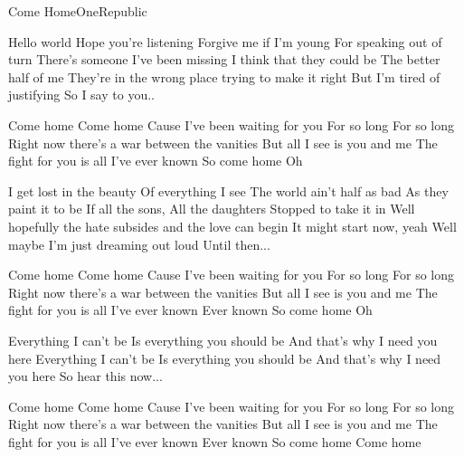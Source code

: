 \documentclass[a4paper,11pt,french]{article}
\begin{document}
\begin{Song}{Come Home}{OneRepublic}
\begin{multicols}{2}

\begin{Verse}
Hello world
Hope you're listening
Forgive me if I’m young
For speaking out of turn
There’s someone I’ve been missing
I think that they could be
The better half of me
They’re in the wrong place trying to make it right
But I’m tired of justifying
So I say to you..
\end{Verse}
\espaceInterStrophe

\begin{Chorus}
Come home
Come home
Cause I’ve been waiting for you
For so long
For so long
Right now there's a war between the vanities
But all I see is you and me
The fight for you is all I’ve ever known
So come home
Oh
\end{Chorus}
\espaceInterStrophe

\begin{Verse}
I get lost in the beauty
Of everything I see
The world ain’t half as bad
As they paint it to be
If all the sons,
All the daughters
Stopped to take it in
Well hopefully the hate subsides and the love can begin
It might start now, yeah
Well maybe I’m just dreaming out loud
Until then...
\end{Verse}
\espaceInterStrophe

\begin{Chorus}
Come home
Come home
Cause I’ve been waiting for you
For so long
For so long
Right now there's a war between the vanities
But all I see is you and me
The fight for you is all I’ve ever known
Ever known
So come home
Oh
\end{Chorus}
\espaceInterStrophe

\begin{Bridge}
Everything I can’t be
Is everything you should be
And that’s why I need you here
Everything I can’t be
Is everything you should be
And that’s why I need you here
So hear this now...
\end{Bridge}
\espaceInterStrophe

\begin{Chorus}
Come home
Come home
Cause I’ve been waiting for you
For so long
For so long
Right now there's a war between the vanities
But all I see is you and me
The fight for you is all I’ve ever known
Ever known
So come home
Come home
\end{Chorus}


\end{multicols}
\end{Song}
\end{document}
